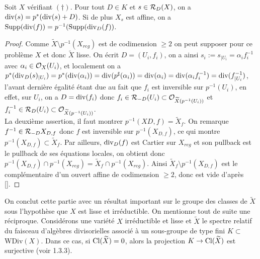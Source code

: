 \begin{prop}
Soit $X$ vérifiant $(\dagger)$. Pour tout $D\in K$ et $s\in\mathcal{R}_D(X)$, on a $\operatorname{div}(s)=p^*(\operatorname{div}(s)+D)$. Si de plus $X_s$ est affine, on a $\operatorname{Supp}(\operatorname{div}(f))=p^{-1}(\operatorname{Supp}(\operatorname{div}_D(f))$.
\end{prop}
\begin{proof}
Comme $\widetilde{X}\setminus p^{-1}(X_{reg})$ est de codimension $\geq 2$ on peut supposer pour ce problème $X$ et donc $\widetilde{X}$ lisse. On écrit $D=(U_i, f_i)$, on a ainsi $s_i:=s_{|U_i}=\alpha_i f_i^{-1}$ avec $\alpha_i\in \mathcal{O}_X(U_i)$, et localement on a $p^*(\operatorname{div}_D(s)_{|U_i})=p^*(\operatorname{div}(\alpha_i))=\operatorname{div}(p^\sharp(\alpha_i))=\operatorname{div}(\alpha_i)=\operatorname{div}(\alpha_i f_i^{-1})=\operatorname{div}(f^{-1}_{|U_i})$, l'avant dernière égalité étant due au fait que $f_i$ est inversible sur $p^{-1}(U_i)$, en effet, sur $U_i$, on a $D=\operatorname{div}(f_i)$ donc $f_i\in \mathcal{R}_{-D}(U_i)\subset\mathcal{O}_{\widetilde{X}(p^{-1}(U_i))}$ et $f_i^{-1}\in \mathcal{R}_D(U_i)\subset\mathcal{O}_{\widetilde{X}(p^{-1}(U_i))}$.\\
La deuxième assertion, il faut montrer $p^{-1}(X{D,f})=\widetilde{X}_f$. On remarque $f^{-1}\in \mathcal{R}_{-D}{X_{D,f}}$ donc $f$ est inversible sur $p^{-1}(X_{D,f})$, ce qui montre $p^{-1}(X_{D,f})\subset \widetilde{X}_f$. Par ailleurs, $\operatorname{div}_D(f)$ est Cartier sur $X_{reg}$ et son pullback est le pullback de ses équations locales, on obtient donc $p^{-1}(X_{D,f})\cap p^{-1}(X_{reg})=\widetilde{X}_f \cap p^{-1}(X_{reg})$. Ainsi $\widetilde{X}_f \setminus p^{-1}(X_{D,f})$ est le complémentaire d'un ouvert affine de codimension $\geq 2$, donc est vide d'après \ref{}.
\end{proof}

On conclut cette partie avec un résultat important sur le groupe des classes de $\widetilde{X}$ sous l'hypothèse que $X$ est lisse et irréductible. On mentionne tout de suite une réciproque. Considérons une variété $X$ irréductible et lisse et $\widetilde{X}$ le spectre relatif du faisceau d'algèbres divisorielles associé à un sous-groupe de type fini $K\subset$ WDiv$(X)$. Dans ce cas, si $\operatorname{Cl}(\widetilde{X})=0$, alors la projection $K\rightarrow \operatorname{Cl}(\widetilde{X})$ est surjective (voir \cite{coxrings} 1.3.3).

